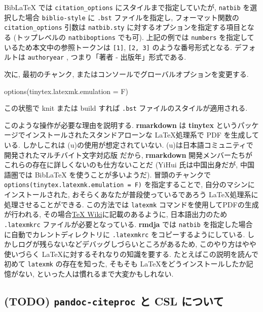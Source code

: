 \documentclass[
  xelatex,ja=standard,jafont=noto]{bxjsbook}
\newenvironment{Shaded}{\begin{snugshade}}{\end{snugshade}}
\newcommand{\AttributeTok}[1]{\textcolor[rgb]{0.77,0.63,0.00}{#1}}
\newcommand{\FunctionTok}[1]{\textcolor[rgb]{0.00,0.00,0.00}{#1}}
\newcommand{\NormalTok}[1]{#1}
\theoremstyle{definition}
\theoremstyle{definition}
\theoremstyle{definition}
\theoremstyle{definition}
\theoremstyle{remark}
\begin{document}
BibLaTeX では \texttt{citation\_options} にスタイルまで指定していたが,
\texttt{natbib} を選択した場合 \texttt{biblio-style} に \texttt{.bst}
ファイルを指定し, フォーマット関数の \texttt{citation\_options} 引数は
\texttt{natbib.sty} に対するオプションを指定する項目となる
(トップレベルの \texttt{natbiboptions} でも可). 上記の例では
\texttt{numbers} を指定しているため本文中の参照トークンは
\texttt{{[}1{]}}, \texttt{{[}2,\ 3{]}} のような番号形式となる.
デフォルトは \texttt{authoryear} , つまり「著者 - 出版年」形式である.

次に, 最初のチャンク, またはコンソールでグローバルオプションを変更する.

\begin{Shaded}
\begin{Highlighting}[]
\FunctionTok{options}\NormalTok{(}\AttributeTok{tinytex.latexmk.emulation =}\NormalTok{ F)}
\end{Highlighting}
\end{Shaded}

この状態で knit または build すれば \texttt{.bst}
ファイルのスタイルが適用される.

このような操作が必要な理由を説明する. \textbf{rmarkdown} は
\textbf{tinytex} というパッケージでインストールされたスタンドアローンな
\LaTeX 処理系で PDF を生成している. しかしこれは
(u)\pBibTeX の使用が想定されていない.
(u)\pBibTeX は日本語コミュニティで開発されたマルチバイト文字対応版
\BibTeX だから, \textbf{rmarkdown}
開発メンバーたちがこれらの存在に詳しくないのも仕方ないことだ (YiHui
氏は中国出身だが, 中国語圏では BibLaTeX を使うことが多いようだ).
冒頭のチャンクで \texttt{options(tinytex.latexmk.emulation\ =\ F)}
を指定することで, 自分のマシンにインストールされた,
おそらくあなたが普段使っているであろう
\LaTeX 処理系に処理させることができる. この方法では \texttt{latexmk}
コマンドを使用してPDFの生成が行われる,
その場合\href{https://texwiki.texjp.org/?Latexmk}{TeX
Wiki}に記載のあるように, 日本語出力のため \texttt{.latexmkrc}
ファイルが必要となっている. \textbf{rmdja} では \texttt{natbib}
を指定した場合に自動でカレントディレクトリに \texttt{.latexmkrc}
をコピーするようにしている.
しかしログが残らないなどデバッグしづらいところがあるため,
このやり方はやや使いづらく \LaTeX に対するそれなりの知識を要する.
たとえばこの説明を読んで初めて \texttt{latexmk} の存在を知った, そもそも
\LaTeX をどうインストールしたか記憶がない,
といった人は慣れるまで大変かもしれない.

\hypertarget{todo-pandoc-citeproc-ux3068-csl-ux306bux3064ux3044ux3066}{%
\subsection{\texorpdfstring{(TODO) \texttt{pandoc-citeproc} と CSL
について}{(TODO) pandoc-citeproc と CSL について}}\label{todo-pandoc-citeproc-ux3068-csl-ux306bux3064ux3044ux3066}}
\end{document}

